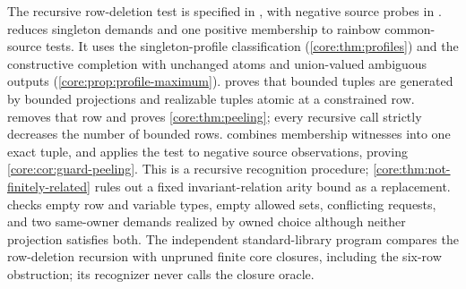 The recursive row-deletion test is specified in
, with negative source probes
in .
 reduces singleton demands and one
positive membership to rainbow common-source tests. It uses the singleton-profile
classification (\cref{core:thm:profiles}) and the constructive completion
with unchanged atoms and union-valued ambiguous outputs
(\cref{core:prop:profile-maximum}).
 proves that bounded tuples are
generated by bounded projections and realizable tuples atomic at a constrained
row.  removes that row and proves
\cref{core:thm:peeling}; every recursive call strictly decreases the number
of bounded rows.  combines membership
witnesses into one exact tuple, and 
applies the test to negative source observations, proving
\cref{core:cor:guard-peeling}. This is a recursive recognition procedure;
\cref{core:thm:not-finitely-related} rules out a fixed invariant-relation
arity bound as a replacement.
 checks empty row and variable types, empty
allowed sets, conflicting requests, and two same-owner demands realized by
owned choice although neither projection satisfies both.
The independent standard-library program
 compares the row-deletion
recursion with unpruned finite core closures, including the six-row
obstruction; its recognizer never calls the closure oracle.

